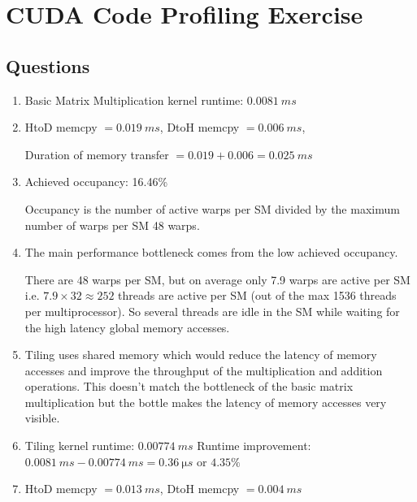 \documentclass[../main.tex]{subfiles}
\begin{document}
\pagestyle{fancy}


\renewcommand{\thefigure}{\arabic{figure}}
\section*{CUDA Code Profiling Exercise}

\subsection*{Questions}

\begin{enumerate}
    \item Basic Matrix Multiplication kernel runtime: $\qty{0.0081}{ms}$
   
    \item HtoD memcpy $= \qty{0.019}{ms}$, DtoH memcpy $= \qty{0.006}{ms}$,

    Duration of memory transfer $= 0.019 + 0.006 = \qty{0.025}{ms}$

    \item Achieved occupancy: 16.46\%

    Occupancy is the number of active warps per SM divided by the maximum number of warps per SM 
    48 warps.
    

    \item The main performance bottleneck comes from the low achieved occupancy. 

    There are 48 warps per SM, but on average only 7.9 warps are active per SM i.e. 
    $7.9 \times 32 \approx 252$ threads are active per SM (out of the max 1536 threads per 
    multiprocessor). So several threads are idle in the SM while waiting for the high latency
    global memory accesses.

    \item Tiling uses shared memory which would reduce the latency of memory accesses and improve the throughput of
    the multiplication and addition operations. This doesn't match the bottleneck
    of the basic matrix multiplication but the bottle makes the latency of memory accesses very
    visible.

    \item Tiling kernel runtime: $\qty{0.00774}{ms}$
    Runtime improvement: $\qty{0.0081}{ms} - \qty{0.00774}{ms} = \qty{0.36}{\micro s}$ or $4.35\%$

    \item HtoD memcpy $= \qty{0.013}{ms}$, DtoH memcpy $= \qty{0.004}{ms}$


\end{enumerate}
\end{document}
